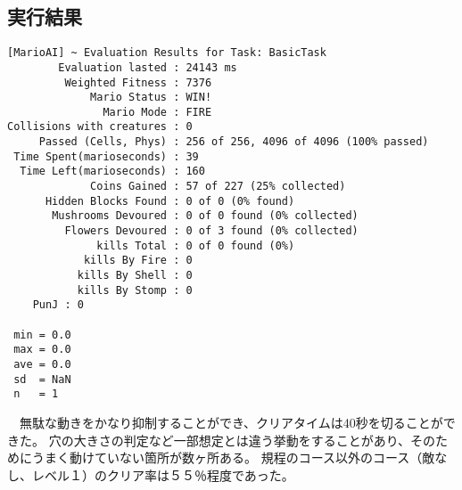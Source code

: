 \documentclass[a4j]{jarticle}
\begin{document}
\subsection{実行結果}
\begin{verbatim}
[MarioAI] ~ Evaluation Results for Task: BasicTask
        Evaluation lasted : 24143 ms
         Weighted Fitness : 7376
             Mario Status : WIN!
               Mario Mode : FIRE
Collisions with creatures : 0
     Passed (Cells, Phys) : 256 of 256, 4096 of 4096 (100% passed)
 Time Spent(marioseconds) : 39
  Time Left(marioseconds) : 160
             Coins Gained : 57 of 227 (25% collected)
      Hidden Blocks Found : 0 of 0 (0% found)
       Mushrooms Devoured : 0 of 0 found (0% collected)
         Flowers Devoured : 0 of 3 found (0% collected)
              kills Total : 0 of 0 found (0%)
            kills By Fire : 0
           kills By Shell : 0
           kills By Stomp : 0
    PunJ : 0

 min = 0.0
 max = 0.0
 ave = 0.0
 sd  = NaN
 n   = 1
\end{verbatim}
　無駄な動きをかなり抑制することができ、クリアタイムは40秒を切ることができた。
穴の大きさの判定など一部想定とは違う挙動をすることがあり、そのためにうまく動けていない箇所が数ヶ所ある。
規程のコース以外のコース（敵なし、レベル１）のクリア率は５５％程度であった。
\end{document}
